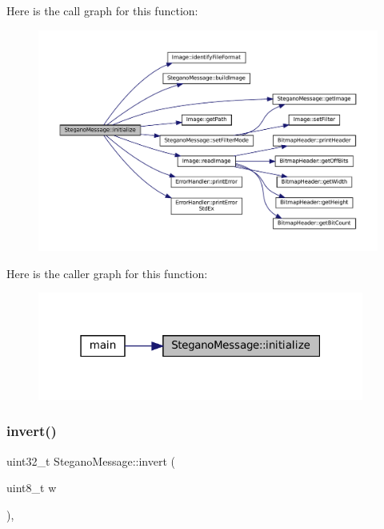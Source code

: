 Here is the call graph for this function\+:\nopagebreak
\begin{figure}[H]
\begin{center}
\leavevmode
\includegraphics[width=350pt]{classSteganoMessage_aeb4d2b69498c148508e2ca70194679cc_cgraph}
\end{center}
\end{figure}
Here is the caller graph for this function\+:\nopagebreak
\begin{figure}[H]
\begin{center}
\leavevmode
\includegraphics[width=304pt]{classSteganoMessage_aeb4d2b69498c148508e2ca70194679cc_icgraph}
\end{center}
\end{figure}
\mbox{\label{classSteganoMessage_af46fa3a09a19fc73c146e22d6a32657a}} 
\subsubsection{\texorpdfstring{invert()}{invert()}}
{\footnotesize\ttfamily uint32\+\_\+t Stegano\+Message\+::invert (\begin{DoxyParamCaption}\item[{uint8\+\_\+t}]{w }\end{DoxyParamCaption})\hspace{0.3cm}{\ttfamily [static]}, {\ttfamily [private]}}



